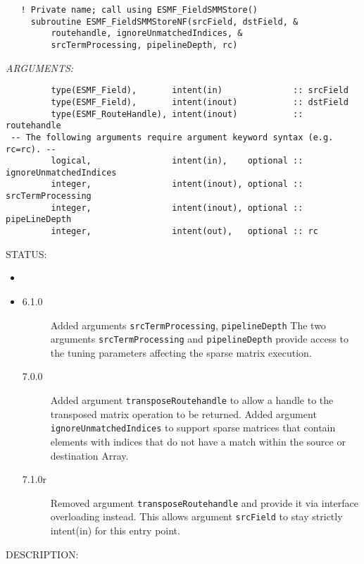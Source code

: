    
\begin{verbatim}   ! Private name; call using ESMF_FieldSMMStore() 
     subroutine ESMF_FieldSMMStoreNF(srcField, dstField, &
         routehandle, ignoreUnmatchedIndices, &
         srcTermProcessing, pipelineDepth, rc)\end{verbatim}{\em ARGUMENTS:}
\begin{verbatim}         type(ESMF_Field),       intent(in)              :: srcField  
         type(ESMF_Field),       intent(inout)           :: dstField  
         type(ESMF_RouteHandle), intent(inout)           :: routehandle
 -- The following arguments require argument keyword syntax (e.g. rc=rc). --
         logical,                intent(in),    optional :: ignoreUnmatchedIndices
         integer,                intent(inout), optional :: srcTermProcessing
         integer,                intent(inout), optional :: pipeLineDepth
         integer,                intent(out),   optional :: rc \end{verbatim}
{\sf STATUS:}
   \begin{itemize}
   \item{}
   \item{}
   \begin{description}
   \item[6.1.0] Added arguments {\tt srcTermProcessing}, {\tt pipelineDepth}
                The two arguments {\tt srcTermProcessing} and {\tt pipelineDepth}
                provide access to the tuning parameters affecting the sparse matrix
                execution. 
   \item[7.0.0] Added argument {\tt transposeRoutehandle} to allow a handle to
                the transposed matrix operation to be returned.\newline
                Added argument {\tt ignoreUnmatchedIndices} to support sparse 
                matrices that contain elements with indices that do not have a
                match within the source or destination Array.
   \item[7.1.0r] Removed argument {\tt transposeRoutehandle} and provide it
                via interface overloading instead. This allows argument 
                {\tt srcField} to stay strictly intent(in) for this entry point.
   \end{description}
   \end{itemize}
  
{\sf DESCRIPTION:\\ }

